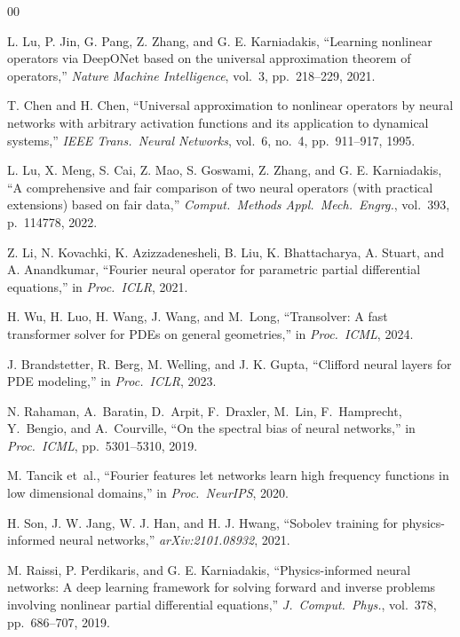 \documentclass[conference]{IEEEtran}
\begin{document}
\begin{thebibliography}{00}

L. Lu, P. Jin, G. Pang, Z. Zhang, and G. E. Karniadakis,
``Learning nonlinear operators via DeepONet based on the universal approximation theorem of operators,''
\textit{Nature Machine Intelligence}, vol.~3, pp.~218--229, 2021.

T. Chen and H. Chen,
``Universal approximation to nonlinear operators by neural networks with arbitrary activation functions and its application to dynamical systems,''
\textit{IEEE Trans.\ Neural Networks}, vol.~6, no.~4, pp.~911--917, 1995.

L. Lu, X. Meng, S. Cai, Z. Mao, S. Goswami, Z. Zhang, and G. E. Karniadakis,
``A comprehensive and fair comparison of two neural operators (with practical extensions) based on fair data,''
\textit{Comput.\ Methods Appl.\ Mech.\ Engrg.}, vol.~393, p.~114778, 2022.

Z. Li, N. Kovachki, K. Azizzadenesheli, B. Liu, K. Bhattacharya, A. Stuart, and A. Anandkumar,
``Fourier neural operator for parametric partial differential equations,''
in \textit{Proc.\ ICLR}, 2021.

H. Wu, H. Luo, H. Wang, J. Wang, and M.~Long,
``Transolver: A fast transformer solver for PDEs on general geometries,''
in \textit{Proc.\ ICML}, 2024.

J. Brandstetter, R. Berg, M. Welling, and J. K. Gupta,
``Clifford neural layers for PDE modeling,''
in \textit{Proc.\ ICLR}, 2023.

N. Rahaman, A.~Baratin, D.~Arpit, F.~Draxler, M.~Lin, F.~Hamprecht, Y.~Bengio, and A.~Courville,
``On the spectral bias of neural networks,''
in \textit{Proc.\ ICML}, pp.~5301--5310, 2019.

M. Tancik et~al.,
``Fourier features let networks learn high frequency functions in low dimensional domains,''
in \textit{Proc.\ NeurIPS}, 2020.

H. Son, J. W. Jang, W. J. Han, and H. J. Hwang,
``Sobolev training for physics-informed neural networks,''
\textit{arXiv:2101.08932}, 2021.

M. Raissi, P. Perdikaris, and G. E. Karniadakis,
``Physics-informed neural networks: A deep learning framework for solving forward and inverse problems involving nonlinear partial differential equations,''
\textit{J.\ Comput.\ Phys.}, vol.~378, pp.~686--707, 2019.


\end{thebibliography}
\end{document}

